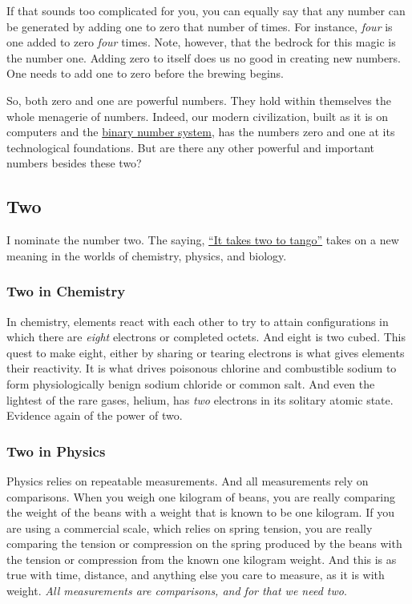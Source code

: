 \documentclass[
  a4paper,
]{article}
\begin{document}
If that sounds too complicated for you, you can equally say that any
number can be generated by adding one to zero that number of times. For
instance, \emph{four} is one added to zero \emph{four} times. Note,
however, that the bedrock for this magic is the number one. Adding zero
to itself does us no good in creating new numbers. One needs to add one
to zero before the brewing begins.

So, both zero and one are powerful numbers. They hold within themselves
the whole menagerie of numbers. Indeed, our modern civilization, built
as it is on computers and the
\href{https://www.britannica.com/science/binary-number-system}{binary
number system}, has the numbers zero and one at its technological
foundations. But are there any other powerful and important numbers
besides these two?

\hypertarget{two}{%
\subsection{Two}\label{two}}

I nominate the number two. The saying,
\href{https://dictionary.cambridge.org/dictionary/english/it-takes-two-to-tango}{``It
takes two to tango''} takes on a new meaning in the worlds of chemistry,
physics, and biology.

\hypertarget{two-in-chemistry}{%
\subsubsection{Two in Chemistry}\label{two-in-chemistry}}

In chemistry, elements react with each other to try to attain
configurations in which there are \emph{eight} electrons or completed
octets. And eight is two cubed. This quest to make eight, either by
sharing or tearing electrons is what gives elements their reactivity. It
is what drives poisonous chlorine and combustible sodium to form
physiologically benign sodium chloride or common salt. And even the
lightest of the rare gases, helium, has \emph{two} electrons in its
solitary atomic state. Evidence again of the power of two.

\hypertarget{two-in-physics}{%
\subsubsection{Two in Physics}\label{two-in-physics}}

Physics relies on repeatable measurements. And all measurements rely on
comparisons. When you weigh one kilogram of beans, you are really
comparing the weight of the beans with a weight that is known to be one
kilogram. If you are using a commercial scale, which relies on spring
tension, you are really comparing the tension or compression on the
spring produced by the beans with the tension or compression from the
known one kilogram weight. And this is as true with time, distance, and
anything else you care to measure, as it is with weight. \emph{All
measurements are comparisons, and for that we need two}.
\end{document}
